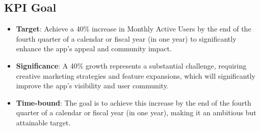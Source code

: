 \documentclass{article}
\begin{document}
\subsection{KPI Goal}
\begin{itemize}
    \item \textbf{Target}: Achieve a 40\% increase in Monthly Active Users by the end of the fourth quarter of a calendar or fiscal year (in one year) to significantly enhance the app's appeal and community impact.
    \item \textbf{Significance}: A 40\% growth represents a substantial challenge, requiring creative marketing strategies and feature expansions, which will significantly improve the app's visibility and user community.
    \item \textbf{Time-bound}: The goal is to achieve this increase by the end of the fourth quarter of a calendar or fiscal year (in one year), making it an ambitious but attainable target.
\end{itemize}
\end{document}
